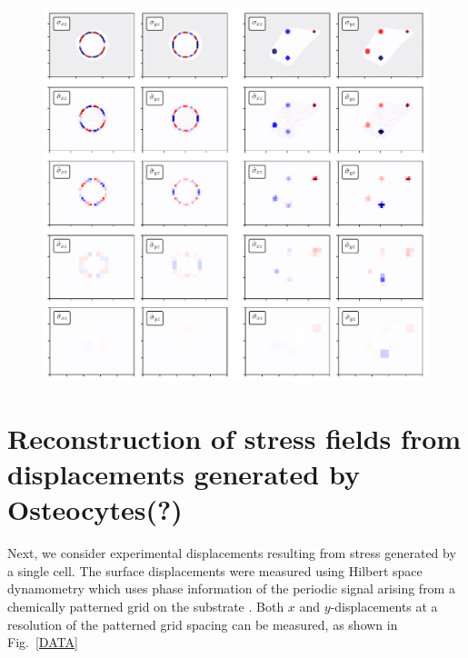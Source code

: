 \documentclass[aps,prl,reprint,twocolumn,groupedaddress,showpacs]{revtex4-1}
\begin{document}
\begin{figure}
\includegraphics[width=\linewidth]{gridspacefig}
\end{figure}



\section{Reconstruction of stress fields from displacements 
generated by Osteocytes(?)}

Next, we consider experimental displacements resulting from stress
generated by a single cell. The surface displacements were measured
using Hilbert space dynamometry which uses phase information of the
periodic signal arising from a chemically patterned grid on the
substrate \cite{POPESCU}.  Both $x$ and $y$-displacements at a
resolution of the patterned grid spacing can be measured, as shown in
Fig.~\ref{DATA}
\end{document}
